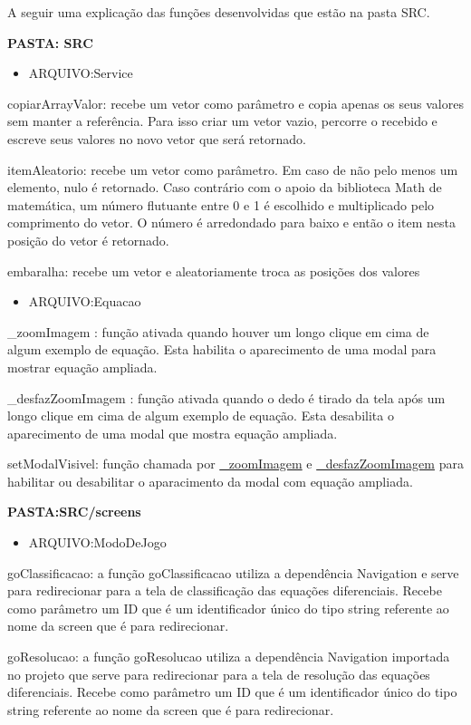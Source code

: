 A seguir uma explicação das funções desenvolvidas que estão na pasta SRC.

\textbf{PASTA: SRC}
\begin{itemize}
\item ARQUIVO:Service
\end{itemize}
copiarArrayValor: recebe um vetor como parâmetro e copia apenas os seus valores sem manter a referência. Para isso criar um vetor vazio, percorre o recebido e escreve seus valores no novo vetor que será retornado.

itemAleatorio: recebe um vetor como parâmetro. Em caso de não pelo menos um elemento, nulo é retornado. Caso contrário com o apoio da biblioteca Math de matemática, um número flutuante entre 0 e 1 é escolhido e multiplicado pelo comprimento do vetor. O número é arredondado para baixo e então o item nesta posição do vetor é retornado.

embaralha: recebe um vetor e aleatoriamente troca as posições dos valores

\begin{itemize}
	\item ARQUIVO:Equacao
\end{itemize}

\_zoomImagem
\label{_zoomImagem}: função ativada quando houver um longo clique em cima de algum exemplo de equação. Esta habilita o aparecimento de uma modal para mostrar equação ampliada.

\_desfazZoomImagem
\label{_desfazZoomImagem}: função ativada quando o dedo é tirado da tela após um longo clique em cima de algum exemplo de equação. Esta desabilita o aparecimento de uma modal que mostra equação ampliada.

setModalVisivel: função chamada por \hyperref[_zoomImagem]{\_zoomImagem} e \hyperref[_desfazZoomImagem]{\_desfazZoomImagem} para habilitar ou desabilitar o aparacimento da modal com equação ampliada.



\textbf{PASTA:SRC/screens}
\begin{itemize}
\item ARQUIVO:ModoDeJogo
\end{itemize}
goClassificacao: a função goClassificacao utiliza a dependência Navigation e serve para redirecionar para a tela de classificação das equações diferenciais. Recebe como parâmetro um ID que é um identificador único do tipo string referente ao nome da screen que é para redirecionar.

goResolucao: a função goResolucao utiliza a dependência Navigation importada no projeto que serve para redirecionar para a tela de resolução das equações diferenciais. Recebe como parâmetro um ID que é um identificador único do tipo string referente ao nome da screen que é para redirecionar.

